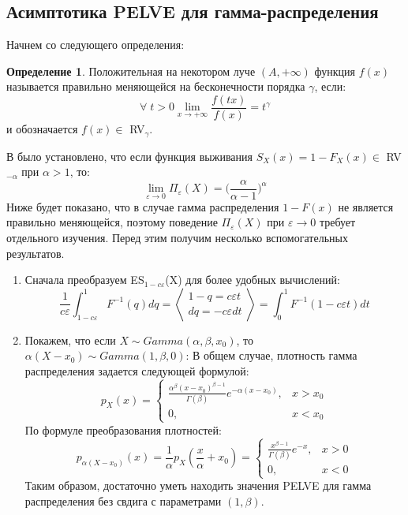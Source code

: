 \documentclass[12pt]{article}
\theoremstyle{plain}
\theoremstyle{definition}
\newtheorem{definition}{Определение}[section]
\theoremstyle{remark}
\begin{document}
\FloatBarrier

\subsection{Асимптотика PELVE для гамма-распределения}
Начнем со следующего определения:
\begin{definition}
    Положительная на некотором луче $(A, +\infty)$ функция $f(x)$ называется правильно меняющейся на бесконечности порядка $\gamma$, если:
    \[\forall \; t>0 \underset{x\to +\infty}{\lim}\frac{f(tx)}{f(x)} = t^\gamma\]
и обозначается $f(x)\in $ RV$_{\gamma}$.
\end{definition}
В \cite{метка0} было установлено, что если функция выживания $S_X(x) = 1-F_X(x) \in $ RV$_{-\alpha}$ при $\alpha > 1$, то:
\[
    \underset{\varepsilon \to 0}{\lim}\Pi_\varepsilon(X) = \bigg(\frac{\alpha}{\alpha - 1}\bigg)^\alpha
\]
Ниже будет показано, что в случае гамма распределения $1-F(x)$ не является правильно меняющейся, поэтому поведение $\Pi_\varepsilon(X)$ при $\varepsilon \to 0$ требует отдельного изучения. Перед этим получим несколько вспомогательных результатов.

\begin{enumerate}
    \item 
            Сначала преобразуем ES$_{1-c\varepsilon}$(X) для более удобных вычислений:
            \begin{equation}
                \frac{1}{c\varepsilon}\int_{1-c\varepsilon}^1F^{-1}(q)dq = 
                \left\langle
                 \begin{array}{c}
                    1 - q = c\varepsilon t \\
                    dq = -c\varepsilon dt
                  \end{array}
                \right\rangle
                =\int_0^1F^{-1}(1-c\varepsilon t)dt 
            \end{equation}

    \item
    Покажем, что если $X \sim Gamma(\alpha, \beta, x_0)$, то $\alpha (X - x_0) \sim Gamma(1,\beta, 0)$:
    В общем случае, плотность гамма распределения задается следующей формулой:
    \[
        p_X(x)= 
        \begin{cases}
            \frac{\alpha^\beta(x-x_0)^{\beta - 1}}{\Gamma(\beta)}e^{-\alpha(x-x_0)}, & x > x_0 \\
            0, & x < x_0
        \end{cases} 
    \]
    По формуле преобразования плотностей:
    \[
        p_{\alpha(X - x_0)}(x) = \frac{1}{\alpha}p_X(\frac{x}{\alpha}+x_0) =
        \begin{cases}
            \frac{x^{\beta-1}}{\Gamma(\beta)}e^{-x}, & x > 0 \\
            0, & x < 0
        \end{cases} 
    \]
    Таким образом, достаточно уметь находить значения PELVE для гамма распределения без свдига с параметрами $(1, \beta)$.
\end{enumerate}
\end{document}
